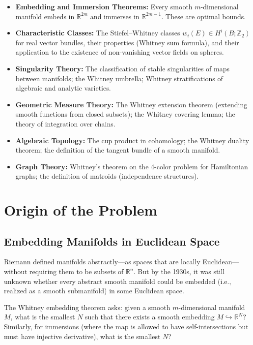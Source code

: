 \begin{itemize}
    \item \textbf{Embedding and Immersion Theorems:} Every smooth $m$-dimensional manifold embeds in $\mathbb{R}^{2m}$ and immerses in $\mathbb{R}^{2m-1}$. These are optimal bounds.
    \item \textbf{Characteristic Classes:} The Stiefel--Whitney classes $w_i(E) \in H^i(B; \mathbb{Z}_2)$ for real vector bundles, their properties (Whitney sum formula), and their application to the existence of non-vanishing vector fields on spheres.
    \item \textbf{Singularity Theory:} The classification of stable singularities of maps between manifolds; the Whitney umbrella; Whitney stratifications of algebraic and analytic varieties.
    \item \textbf{Geometric Measure Theory:} The Whitney extension theorem (extending smooth functions from closed subsets); the Whitney covering lemma; the theory of integration over chains.
    \item \textbf{Algebraic Topology:} The cup product in cohomology; the Whitney duality theorem; the definition of the tangent bundle of a smooth manifold.
    \item \textbf{Graph Theory:} Whitney's theorem on the 4-color problem for Hamiltonian graphs; the definition of matroids (independence structures).
\end{itemize}

\section{Origin of the Problem}

\subsection{Embedding Manifolds in Euclidean Space}

Riemann defined manifolds abstractly---as spaces that are locally Euclidean---without requiring them to be subsets of $\mathbb{R}^n$. But by the 1930s, it was still unknown whether every abstract smooth manifold could be embedded (i.e., realized as a smooth submanifold) in some Euclidean space.

The Whitney embedding theorem asks: given a smooth $m$-dimensional manifold $M$, what is the smallest $N$ such that there exists a smooth embedding $M \hookrightarrow \mathbb{R}^N$? Similarly, for immersions (where the map is allowed to have self-intersections but must have injective derivative), what is the smallest $N$?

